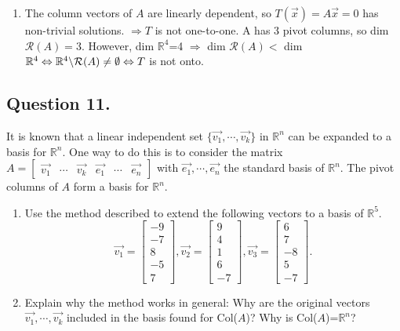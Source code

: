 \documentclass{article}
\begin{document}
\begin{enumerate}
\item The column vectors of $A$ are linearly dependent, so $T(\Vec{x})=A\Vec{x}=0$ has non-trivial solutions.\newline 
$\Rightarrow T$ is not one-to-one.\newline
A has 3 pivot columns, so dim $\mathcal{R}(A) =3$. However, dim $\mathbb{R}^4$=4\newline
$\Rightarrow$ dim $\mathcal{R}(A)<$ dim $\mathbb{R}^4\Leftrightarrow \mathbb{R}^4\symbol{92}\mathcal{R}(A)\neq \emptyset\Leftrightarrow T$ is not onto.
\end{enumerate}

\subsection*{Question 11.}
It is known that a linear independent set $\{\Vec{v_1},\cdots,\Vec{v_k}\}$ in $\mathbb{R}^n$ can be expanded to a basis for $\mathbb{R}^n$. One way to do this is to consider the matrix $A=[\begin{array}{cccccc}\Vec{v_1}&\cdots&\Vec{v_k}&\Vec{e_1}&\cdots&\Vec{e_n}\end{array}]$ with $\Vec{e_1},\cdots,\Vec{e_n}$ the standard basis of $\mathbb{R}^n$. The pivot columns of $A$ form a basis for $\mathbb{R}^n$.
\begin{enumerate}
    \item Use the method described to extend the following vectors to a basis of $\mathbb{R}^5$.
    \[\Vec{v_1}=\left[\begin{array}{r}-9\\-7\\8\\-5\\7\end{array}\right],\Vec{v_2}=\left[\begin{array}{r}9\\4\\1\\6\\-7\end{array}\right],\Vec{v_3}=\left[\begin{array}{r}6\\7\\-8\\5\\-7\end{array}\right].\]
    \item Explain why the method works in general: Why are the original vectors $\Vec{v_1},\cdots,\Vec{v_k}$ included in the basis found for Col($A$)? Why is Col($A$)=$\mathbb{R}^n$?
\end{enumerate}
\end{document}
